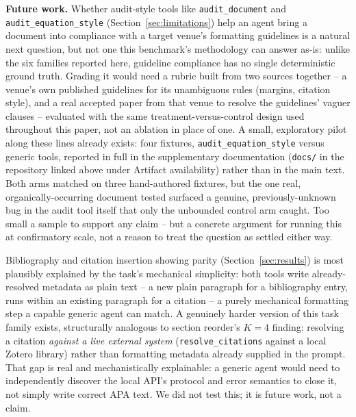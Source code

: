 \documentclass[11pt]{article}
\DeclareRobustCommand{\claim}[2]{#2}
\begin{document}
\textbf{Future work.} \claim{audit-tools-out-of-scope}{\claim{anchoredit-subset-scope}{Whether audit-style tools like \texttt{audit\_document} and
\texttt{audit\_equation\_style} (Section~\ref{sec:limitations}) help an agent bring a document
into compliance with a target venue's formatting guidelines is a natural next question, but not
one this benchmark's methodology can answer as-is}:} \claim{six-task-families}{unlike the six families reported here,}
guideline compliance has no single deterministic ground truth. Grading it would need a rubric
built from two sources together -- a venue's own published guidelines for its unambiguous rules
(margins, citation style), and a real accepted paper from that venue to resolve the guidelines'
vaguer clauses -- evaluated with the same treatment-versus-control design used throughout this
paper, not an ablation in place of one. A small, exploratory pilot along these lines already
exists: four fixtures, \texttt{audit\_equation\_style} versus generic tools, \claim{supplementary-docs-location}{reported in full in
the supplementary documentation (\texttt{docs/} in the repository linked above under Artifact
availability) rather than in the main text.} Both arms matched on three hand-authored fixtures, but the
one real, organically-occurring document tested surfaced a genuine, previously-unknown bug in the
audit tool itself that only the unbounded control arm caught. Too small a sample to support any
claim -- but a concrete argument for running this at confirmatory scale, not a reason to treat the
question as settled either way.

\claim{bib-citation-mechanical-simplicity}{\claim{bib-citation-parity}{Bibliography and citation insertion showing parity (Section~\ref{sec:results})} is most plausibly
explained by the task's mechanical simplicity: both tools write already-resolved metadata as plain
text -- a new plain paragraph for a bibliography entry, runs within an existing paragraph for a
citation -- a purely mechanical formatting step a capable generic agent can match.} A
genuinely harder version of this task family exists, structurally analogous to section reorder's
$K=4$ finding: resolving a citation \emph{against a live external system} (\texttt{resolve\_citations}
against a local Zotero library) rather than formatting metadata already supplied in the prompt.
That gap is real and mechanistically explainable: a generic agent would need to independently
discover the local API's protocol and error semantics to close it, not simply write correct APA
text. We did not test this; it is future work, not a claim.
\end{document}
